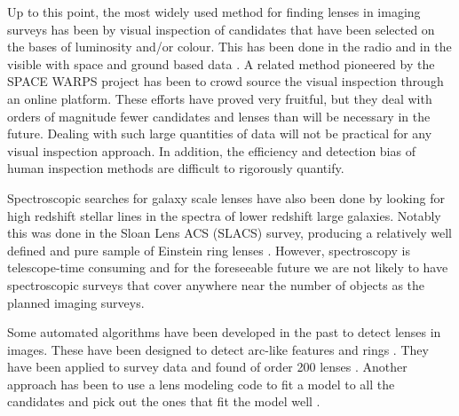 \documentclass{aa}
\begin{document}
Up to this point, the most widely used method for finding lenses in imaging surveys has been by visual inspection of candidates that have been selected on the bases of luminosity and/or colour.  This has been done in the radio \citep{2003MNRAS.341...13B} and in the visible with space and ground based data \citep{2008MNRAS.389.1311J,2008ApJS..176...19F,2010AandA...517A..25S,2014MNRAS.439.3392P}.  A related method pioneered by the SPACE WARPS project \citep{2016MNRAS.455.1171M,2016MNRAS.455.1191M,2015MNRAS.452..502G} has been to crowd source the visual inspection through an online platform.  These efforts have proved very fruitful, but they deal with orders of magnitude fewer candidates and lenses than will be necessary in the future.  Dealing with such large quantities of data will not be practical for any visual inspection approach.  In addition, the efficiency and detection bias of human inspection methods are difficult to rigorously quantify.

Spectroscopic searches for galaxy scale lenses have also been done by looking for high redshift stellar lines in the spectra of lower redshift large galaxies.  Notably this was done in the Sloan Lens ACS (SLACS) survey, producing a relatively well defined and pure sample of Einstein ring lenses \citep{2006MNRAS.369.1521W,2006ApJ...638..703B,2012ApJ...744...41B,2015MNRAS.449.3441S}.  However, spectroscopy is telescope-time consuming and for the foreseeable future we are not likely to have spectroscopic surveys that cover anywhere near the number of objects as the planned imaging surveys.

Some automated algorithms have been developed in the past to detect lenses in images.  These have been designed to detect arc-like features \citep{2006astro.ph..6757A,2007AandA...472..341S, 2017AandA...597A.135B} and rings \citep{2014ApJ...785..144G,2014AandA...566A..63J}.  They have been applied to survey data and found of order 200 lenses \citep{2007AandA...461..813C,2012ApJ...749...38M,2016AandA...592A..75P}.  Another approach has been to use a lens modeling code to fit a model to all the candidates and pick out the ones that fit the model well \citep{2009ApJ...694..924M,2017arXiv170401585S}.
\end{document}
